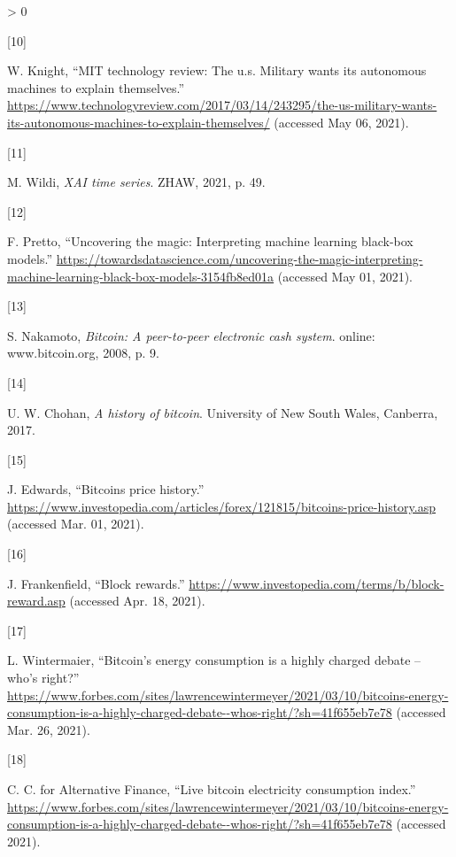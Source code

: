 \documentclass[
]{article}
\newlength{\cslhangindent}
\newlength{\csllabelwidth}
\newenvironment{CSLReferences}[2] %
 {%
  \setlength{\parindent}{0pt}
  \ifodd #1 \everypar{\setlength{\hangindent}{\cslhangindent}}\ignorespaces\fi
  \ifnum #2 > 0
  \setlength{\parskip}{#2\baselineskip}
  \fi
 }%
 {}
\newcommand{\CSLLeftMargin}[1]{\parbox[t]{\csllabelwidth}{#1}}
\newcommand{\CSLRightInline}[1]{\parbox[t]{\linewidth - \csllabelwidth}{#1}\break}
\begin{document}
\begin{CSLReferences}{0}{0}
\leavevmode\hypertarget{ref-blackbox}{}%
\CSLLeftMargin{{[}10{]} }
\CSLRightInline{W. Knight, {``MIT technology review: The u.s. Military
wants its autonomous machines to explain themselves.''}
\url{https://www.technologyreview.com/2017/03/14/243295/the-us-military-wants-its-autonomous-machines-to-explain-themselves/}
(accessed May 06, 2021).}

\leavevmode\hypertarget{ref-slide_xai}{}%
\CSLLeftMargin{{[}11{]} }
\CSLRightInline{M. Wildi, \emph{XAI time series}. ZHAW, 2021, p. 49.}

\leavevmode\hypertarget{ref-xai_blackbox}{}%
\CSLLeftMargin{{[}12{]} }
\CSLRightInline{F. Pretto, {``Uncovering the magic: Interpreting machine
learning black-box models.''}
\url{https://towardsdatascience.com/uncovering-the-magic-interpreting-machine-learning-black-box-models-3154fb8ed01a}
(accessed May 01, 2021).}

\leavevmode\hypertarget{ref-bitcoin}{}%
\CSLLeftMargin{{[}13{]} }
\CSLRightInline{S. Nakamoto, \emph{Bitcoin: A peer-to-peer electronic
cash system}. online: www.bitcoin.org, 2008, p. 9.}

\leavevmode\hypertarget{ref-A_History_of_Bitcoin}{}%
\CSLLeftMargin{{[}14{]} }
\CSLRightInline{U. W. Chohan, \emph{A history of bitcoin}. University of
New South Wales, Canberra, 2017.}

\leavevmode\hypertarget{ref-Bitcoin_history}{}%
\CSLLeftMargin{{[}15{]} }
\CSLRightInline{J. Edwards, {``Bitcoins price history.''}
\url{https://www.investopedia.com/articles/forex/121815/bitcoins-price-history.asp}
(accessed Mar. 01, 2021).}

\leavevmode\hypertarget{ref-blockrewards}{}%
\CSLLeftMargin{{[}16{]} }
\CSLRightInline{J. Frankenfield, {``Block rewards.''}
\url{https://www.investopedia.com/terms/b/block-reward.asp} (accessed
Apr. 18, 2021).}

\leavevmode\hypertarget{ref-energy_consumption}{}%
\CSLLeftMargin{{[}17{]} }
\CSLRightInline{L. Wintermaier, {``Bitcoin's energy consumption is a
highly charged debate -- who's right?''}
\url{https://www.forbes.com/sites/lawrencewintermeyer/2021/03/10/bitcoins-energy-consumption-is-a-highly-charged-debate--whos-right/?sh=41f655eb7e78}
(accessed Mar. 26, 2021).}

\leavevmode\hypertarget{ref-energy_index}{}%
\CSLLeftMargin{{[}18{]} }
\CSLRightInline{C. C. for Alternative Finance, {``Live bitcoin
electricity consumption index.''}
\url{https://www.forbes.com/sites/lawrencewintermeyer/2021/03/10/bitcoins-energy-consumption-is-a-highly-charged-debate--whos-right/?sh=41f655eb7e78}
(accessed 2021).}


\end{CSLReferences}
\end{document}
